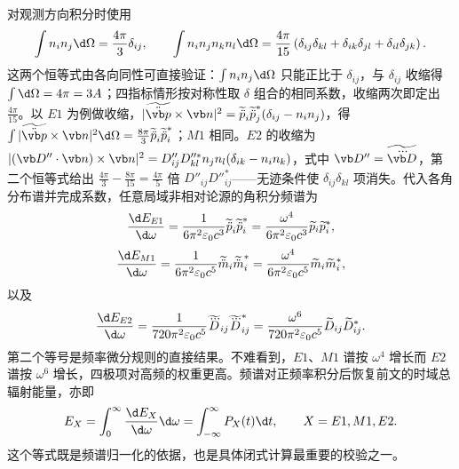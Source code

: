 对观测方向积分时使用
\begin{equation*}
	\int n_i n_j\d\Omega=\frac{4\pi}{3}\delta_{ij},
	\qquad
	\int n_i n_jn_kn_l\d\Omega
	=\frac{4\pi}{15}
	\left(\delta_{ij}\delta_{kl}+\delta_{ik}\delta_{jl}+\delta_{il}\delta_{jk}\right).
\end{equation*}
这两个恒等式由各向同性可直接验证：$\int n_in_j\d\Omega$ 只能正比于 $\delta_{ij}$，与 $\delta_{ij}$ 收缩得 $\int\d\Omega=4\pi=3A$；四指标情形按对称性取 $\delta$ 组合的相同系数，收缩两次即定出 $\frac{4\pi}{15}$。以 $E1$ 为例做收缩，$|\widetilde{\ddot{\vb p}}\times\vb n|^2=\widetilde{\ddot p}_i\widetilde{\ddot p}_j^*(\delta_{ij}-n_in_j)$，得 $\int|\widetilde{\ddot{\vb p}}\times\vb n|^2\d\Omega=\frac{8\pi}{3}\widetilde{\ddot p}_i\widetilde{\ddot p}_i^*$；$M1$ 相同。$E2$ 的收缩为 $|(\vb D''\cdot\vb n)\times\vb n|^2=D''_{ij}D''^*_{kl}n_jn_l(\delta_{ik}-n_in_k)$，式中 $\vb D''=\widetilde{\dddot{\vb D}}$，第二个恒等式给出 $\frac{4\pi}{3}-\frac{8\pi}{15}=\frac{4\pi}{5}$ 倍 $D''_{ij}D''^*_{ij}$——无迹条件使 $\delta_{ij}\delta_{kl}$ 项消失。代入各角分布谱并完成系数，任意局域非相对论源的角积分频谱为
\begin{equation*}
	\frac{\d E_{E1}}{\d\omega}
	=\frac{1}{6\pi^2\varepsilon_0c^3}
	\widetilde{\ddot p}_i\widetilde{\ddot p}_i^*
	=\frac{\omega^4}{6\pi^2\varepsilon_0c^3}
	\widetilde p_i\widetilde p_i^*,
\end{equation*}
\begin{equation*}
	\frac{\d E_{M1}}{\d\omega}
	=\frac{1}{6\pi^2\varepsilon_0c^5}
	\widetilde{\ddot m}_i\widetilde{\ddot m}_i^*
	=\frac{\omega^4}{6\pi^2\varepsilon_0c^5}
	\widetilde m_i\widetilde m_i^*,
\end{equation*}
以及
\begin{equation*}
	\frac{\d E_{E2}}{\d\omega}
	=\frac{1}{720\pi^2\varepsilon_0c^5}
	\widetilde{\dddot D}_{ij}\widetilde{\dddot D}_{ij}^*
	=\frac{\omega^6}{720\pi^2\varepsilon_0c^5}
	\widetilde D_{ij}\widetilde D_{ij}^*.
\end{equation*}
第二个等号是频率微分规则的直接结果。不难看到，$E1$、$M1$ 谱按 $\omega^4$ 增长而 $E2$ 谱按 $\omega^6$ 增长，四极项对高频的权重更高。频谱对正频率积分后恢复前文的时域总辐射能量，亦即
\begin{equation*}
	E_X=\int_0^\infty\frac{\d E_X}{\d\omega}\d\omega
	=\int_{-\infty}^{\infty}P_X(t)\d t,
	\qquad X=E1,M1,E2.
\end{equation*}
这个等式既是频谱归一化的依据，也是具体闭式计算最重要的校验之一。

